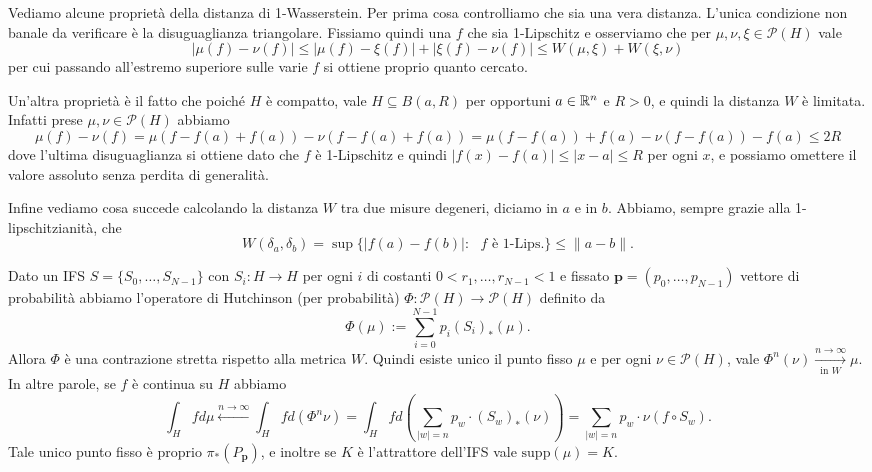 
Vediamo alcune proprietà della distanza di 1-Wasserstein. Per prima cosa controlliamo che sia una vera distanza. 
L'unica condizione non banale da verificare è la disuguaglianza triangolare. 
Fissiamo quindi una $f$ che sia 1-Lipschitz e osserviamo che per $\mu,\nu,\xi\in\mathcal P(H)$ vale
$$|\mu(f) - \nu(f)|\leq |\mu(f) - \xi(f)| + |\xi(f) - \nu(f)| \leq W(\mu,\xi) + W(\xi,\nu)$$
per cui passando all'estremo superiore sulle varie $f$ si ottiene proprio quanto cercato. 

Un'altra proprietà è il fatto che poiché $H$ è compatto, vale $H\subseteq B(a,R)$ per opportuni $a\in\mathbb{R}^{n}$ e $R>0$, e quindi la distanza $W$ è limitata. Infatti prese $\mu,\nu\in\mathcal P(H)$ abbiamo 
$$\mu(f) - \nu(f) = \mu(f-f(a) + f(a)) - \nu(f - f(a) + f(a)) = \mu(f - f(a)) + f(a) - \nu(f-f(a)) - f(a) \leq 2R$$
dove l'ultima disuguaglianza si ottiene dato che $f$ è 1-Lipschitz e quindi $|f(x)-f(a)|\leq |x-a| \leq R$ per ogni $x$, e possiamo omettere il valore assoluto senza perdita di generalità.

Infine vediamo cosa succede calcolando la distanza $W$ tra due misure degeneri, diciamo in $a$ e in $b$. Abbiamo, sempre grazie alla 1-lipschitzianità, che 
$$W(\delta_{a},\delta_{b}) = \sup\{|f(a) - f(b)|:\text{ $f$ è 1-Lips.}\}\leq \|a-b\|.$$

\begin{teorema}
	Dato un IFS $S = \{S_{0},\dots,S_{N-1}\}$ con $S_{i}:H\to H$ per ogni $i$ di costanti $0<r_{1},\dots,r_{N-1}<1$ e fissato $\mathbf p = (p_{0},\dots,p_{N-1})$ vettore di probabilità abbiamo l'operatore di Hutchinson (per probabilità) $\Phi: \mathcal P(H)\to\mathcal P(H)$ definito da 
	$$\Phi(\mu) := \sum_{i = 0}^{N-1} p_{i}(S_{i})_{*}(\mu).$$
	Allora $\Phi$ è una contrazione stretta rispetto alla metrica $W$. 
	Quindi esiste unico il punto fisso $\mu$ e per ogni $\nu\in\mathcal P(H)$, vale $\Phi^{n}(\nu)\xrightarrow[\text{in $W$}]{n\to\infty}\mu$.
	In altre parole, se $f$ è continua su $H$ abbiamo 
	$$\int_{H} fd\mu \xleftarrow{n\to\infty} \int_{H} fd(\Phi^{n}\nu) = \int_{H} fd\left(\sum_{|w|=n}p_{w}\cdot(S_{w})_{*}(\nu)\right) = \sum_{|w| = n} p_{w}\cdot \nu(f\circ S_{w}).$$ 
	Tale unico punto fisso è proprio $\pi_{*}(P_{\mathbf p})$, e inoltre se $K$ è l'attrattore dell'IFS vale $\text{supp}(\mu)= K$.
\end{teorema}

